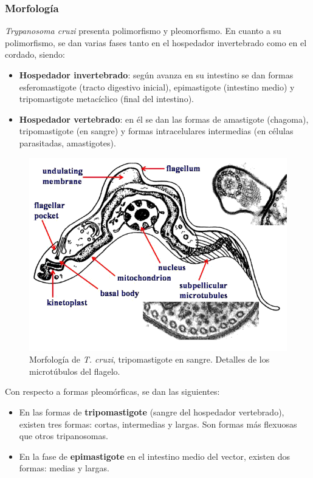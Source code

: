\subsubsection{Morfología}
\begin{multicols}{2}
	\textit{Trypanosoma cruzi} presenta polimorfismo y pleomorfismo. En cuanto a su polimorfismo, se dan varias fases tanto en el hospedador invertebrado como en el cordado, siendo:
	\begin{itemize}[itemsep=0pt,parsep=0pt,topsep=0pt,partopsep=0pt]
		\item \textbf{Hospedador invertebrado}: según avanza en su intestino se dan formas esferomastigote (tracto digestivo inicial), epimastigote (intestino medio) y tripomastigote metacíclico (final del intestino). 
		\item \textbf{Hospedador vertebrado}: en él se dan las formas de amastigote (chagoma), tripomastigote (en sangre) y formas intracelulares intermedias (en células parasitadas, amastigotes).
	\end{itemize}
	\columnbreak
	\begin{figure}[H]
		\centering
		\includegraphics[width=0.8\columnwidth]{A.imagenes/ACV-BioSan-Parasit-TcruziMorf2}
		\caption[Morfología de \textit{T. cruzi}]{Morfología de \textit{T. cruzi}, tripomastigote en sangre. Detalles de los microtúbulos del flagelo. \label{fig:PARASIT:TCruziMorf}}
	\end{figure}
\end{multicols}

Con respecto a formas pleomórficas, se dan las siguientes:
\begin{itemize}[itemsep=0pt,parsep=0pt,topsep=0pt,partopsep=0pt]
	\item En las formas de \textbf{tripomastigote} (sangre del hospedador vertebrado), existen tres formas: cortas, intermedias y largas. Son formas más flexuosas que otros tripanosomas.
	\item En la fase de \textbf{epimastigote} en el intestino medio del vector, existen dos formas: medias y largas.
\end{itemize}
